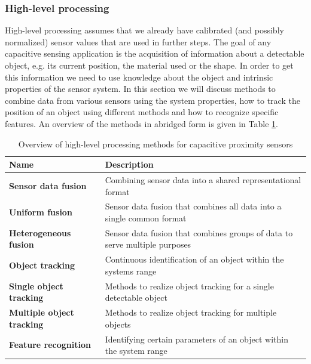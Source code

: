 \subsubsection{High-level processing}
High-level processing assumes that we already have calibrated (and possibly normalized) sensor values that are used in further steps. The goal of any capacitive sensing application is the acquisition of information about a detectable object, e.g. its current position, the material used or the shape. In order to get this information we need to use knowledge about the object and intrinsic properties of the sensor system. In this section we will discuss methods to combine data from various sensors using the system properties, how to track the position of an object using different methods and how to recognize specific features. An overview of the methods in abridged form is given in Table \ref{tab:rel_highlevel}. 
\begin{table}[htbp]
  \centering
  \caption{Overview of high-level processing methods for capacitive proximity sensors}
    \begin{tabular}{lp{5cm}}
    \toprule
    \textbf{Name} & \textbf{Description} \\
    \midrule
    \textbf{Sensor data fusion} & Combining sensor data into a shared representational format \\ \addlinespace
    \textbf{Uniform fusion} & Sensor data fusion that combines all data into a single common format \\ \addlinespace
    \textbf{Heterogeneous fusion} & Sensor data fusion that combines groups of data to serve multiple purposes \\ \addlinespace
    \textbf{Object tracking } & Continuous identification of an object within the systems range \\ \addlinespace
    \textbf{Single object tracking} & Methods to realize object tracking for a single detectable object \\ \addlinespace
    \textbf{Multiple object tracking} & Methods to realize object tracking for multiple objects \\ \addlinespace
    \textbf{Feature recognition} & Identifying certain parameters of an object within the system range \\
    \bottomrule
    \end{tabular}%
  \label{tab:rel_highlevel}
\end{table}%


